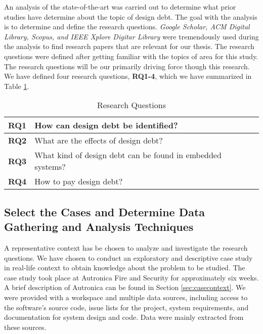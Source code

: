 An analysis of the state-of-the-art was carried out to determine what prior studies have determine about the topic of design debt. The goal with the analysis is to determine and define the research questions. \textit{Google Scholar, ACM Digital Library, Scopus, and IEEE Xplore Digitar Library} were tremendously used during the analysis to find research papers that are relevant for our thesis. The research questions were defined after getting familiar with the topics of area for this study. The research questions will be our primarily driving force though this research. We have defined four research questions, \textbf{RQ1-4}, which we have summarized in Table \ref{researchQuestionsChapter3}.

\begin{table}[]
	\centering
	\caption{Research Questions}
	\label{researchQuestionsChapter3}
	\begin{tabular}{|l|p{8cm}|}
		\hline
		\textbf{RQ1} & How can design debt be identified?     \\ \hline
		\textbf{RQ2} & What are the effects of design debt?  \\ \hline
		\textbf{RQ3} & What kind of design debt can be found in embedded systems? \\ \hline
		\textbf{RQ4} & How to pay design debt? \\ \hline
	\end{tabular}
\end{table}



\subsection{Select the Cases and Determine Data Gathering and Analysis Techniques} %
A representative context has be chosen to analyze and investigate the research questions. We have chosen to conduct an exploratory and descriptive case study in real-life context to obtain knowledge about the problem to be studied. The case study took place at Autronica Fire and Security for approximately six weeks. A brief description of Autronica can be found in Section \ref{sec:casecontext}. We were provided with a workspace and multiple data sources, including access to the software's source code, issue lists for the project, system requirements, and documentation for system design and code. Data were mainly extracted from these sources. 

